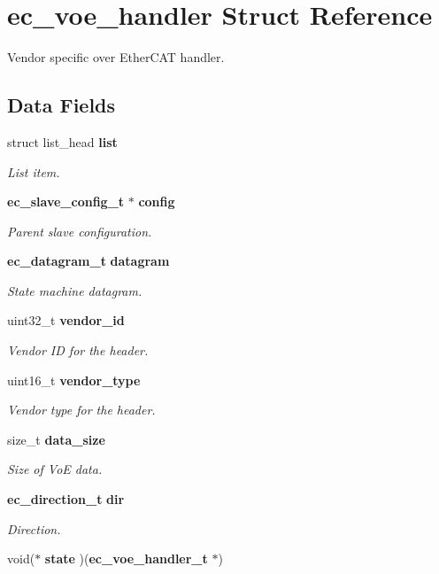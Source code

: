 \section{ec\-\_\-voe\-\_\-handler Struct Reference}
\label{structec__voe__handler}


Vendor specific over Ether\-C\-A\-T handler.  


\subsection*{Data Fields}
\begin{DoxyCompactItemize}
\item 
struct list\-\_\-head {\bf list}
\begin{DoxyCompactList}\small\item\em List item. \end{DoxyCompactList}\item 
{\bf ec\-\_\-slave\-\_\-config\-\_\-t} $\ast$ {\bf config}
\begin{DoxyCompactList}\small\item\em Parent slave configuration. \end{DoxyCompactList}\item 
{\bf ec\-\_\-datagram\-\_\-t} {\bf datagram}
\begin{DoxyCompactList}\small\item\em State machine datagram. \end{DoxyCompactList}\item 
uint32\-\_\-t {\bf vendor\-\_\-id}
\begin{DoxyCompactList}\small\item\em Vendor I\-D for the header. \end{DoxyCompactList}\item 
uint16\-\_\-t {\bf vendor\-\_\-type}
\begin{DoxyCompactList}\small\item\em Vendor type for the header. \end{DoxyCompactList}\item 
size\-\_\-t {\bf data\-\_\-size}
\begin{DoxyCompactList}\small\item\em Size of Vo\-E data. \end{DoxyCompactList}\item 
{\bf ec\-\_\-direction\-\_\-t} {\bf dir}
\begin{DoxyCompactList}\small\item\em Direction. \end{DoxyCompactList}\item 
void($\ast$ {\bf state} )({\bf ec\-\_\-voe\-\_\-handler\-\_\-t} $\ast$)\label{structec__voe__handler_a7d14024529e871ce3ed2bf901afc79ed}


\end{DoxyCompactItemize}
